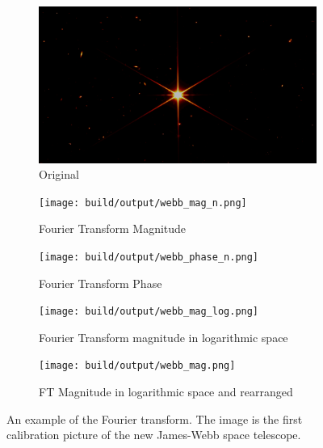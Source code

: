 \begin{figure}[htbp]
    \centering
    \begin{subfigure}[h]{.9\linewidth}
        \centering
        \includegraphics[width=\linewidth]{images/webb.png}
        \caption{Original}
    \end{subfigure}
    \begin{subfigure}[h]{.9\linewidth}
        \centering
        \texttt{[image: build/output/webb\_mag\_n.png]}
        \caption{Fourier Transform Magnitude}
        \label{subfig:ftm_n}
    \end{subfigure}
    \begin{subfigure}[h]{.9\linewidth}
        \centering
        \texttt{[image: build/output/webb\_phase\_n.png]}
        \caption{Fourier Transform Phase}
        \label{subfig:ftp_n}
    \end{subfigure}
    \begin{subfigure}[h]{.9\linewidth}
        \centering
        \texttt{[image: build/output/webb\_mag\_log.png]}
        \caption{Fourier Transform magnitude in logarithmic space}
        \label{subfig:ftm_log}
    \end{subfigure}
    \begin{subfigure}[h]{.9\linewidth}
        \centering
        \texttt{[image: build/output/webb\_mag.png]}
        \caption{FT Magnitude in logarithmic space and rearranged}
        \label{subfig:ftm}
    \end{subfigure}
    \caption{An example of the Fourier transform. The image is the first calibration picture of the new James-Webb space telescope\cite{webbimg}. }
    \label{fig:fourier_example_n}
\end{figure}

